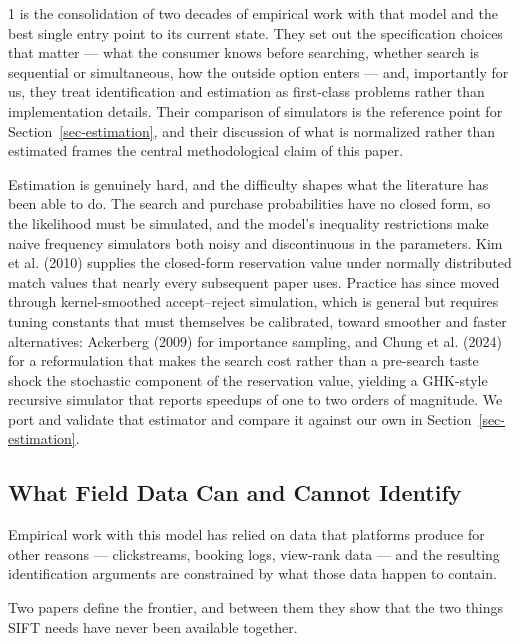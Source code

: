 \documentclass[
  letterpaper,
  DIV=11,
  numbers=noendperiod]{scrartcl}
\begin{document}
1 is the consolidation of two decades of empirical work with that model
and the best single entry point to its current state. They set out the
specification choices that matter --- what the consumer knows before
searching, whether search is sequential or simultaneous, how the outside
option enters --- and, importantly for us, they treat identification and
estimation as first-class problems rather than implementation details.
Their comparison of simulators is the reference point for
Section~\ref{sec-estimation}, and their discussion of what is normalized
rather than estimated frames the central methodological claim of this
paper.

Estimation is genuinely hard, and the difficulty shapes what the
literature has been able to do. The search and purchase probabilities
have no closed form, so the likelihood must be simulated, and the
model's inequality restrictions make naive frequency simulators both
noisy and discontinuous in the parameters. Kim et al. (2010) supplies
the closed-form reservation value under normally distributed match
values that nearly every subsequent paper uses. Practice has since moved
through kernel-smoothed accept--reject simulation, which is general but
requires tuning constants that must themselves be calibrated, toward
smoother and faster alternatives: Ackerberg (2009) for importance
sampling, and Chung et al. (2024) for a reformulation that makes the
search cost rather than a pre-search taste shock the stochastic
component of the reservation value, yielding a GHK-style recursive
simulator that reports speedups of one to two orders of magnitude. We
port and validate that estimator and compare it against our own in
Section~\ref{sec-estimation}.

\subsection{What Field Data Can and Cannot
Identify}\label{sec-lit-field}

Empirical work with this model has relied on data that platforms produce
for other reasons --- clickstreams, booking logs, view-rank data --- and
the resulting identification arguments are constrained by what those
data happen to contain.

Two papers define the frontier, and between them they show that the two
things SIFT needs have never been available together.
\end{document}
